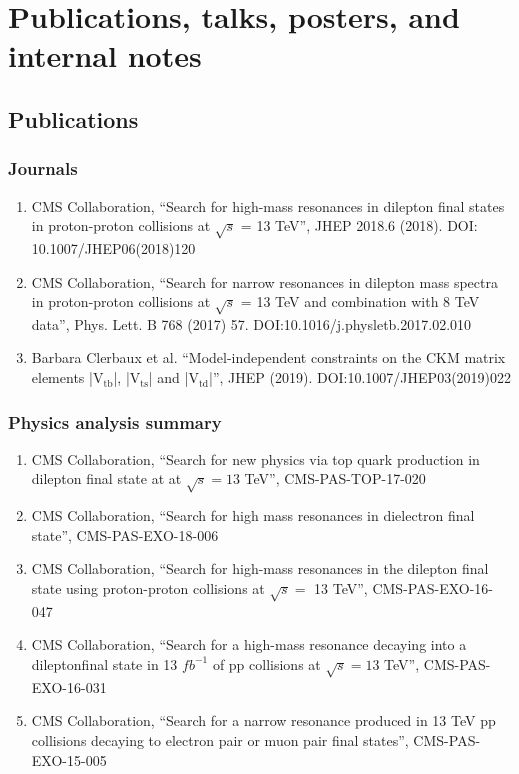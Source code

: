 \chapter*{Publications, talks, posters, and internal notes}\label{chp:Publications}

\section*{Publications}
\subsection*{Journals}
\begin{enumerate}
\item{CMS Collaboration, ``Search for high-mass resonances in dilepton final states in proton-proton collisions at $\sqrt{s}$ = 13 TeV'',  JHEP 2018.6 (2018). DOI: 10.1007/JHEP06(2018)120}
\item{CMS Collaboration, ``Search for narrow resonances in dilepton mass spectra in proton-proton collisions at $\sqrt{s}$ = 13 TeV and combination with 8 TeV data'', Phys. Lett. B 768 (2017) 57. DOI:10.1016/j.physletb.2017.02.010}
\item{Barbara Clerbaux et al. ``Model-independent constraints on the CKM matrix elements |$\mathrm{V_{tb}}$|, |$\mathrm{V_{ts}}$| and |$\mathrm{V_{td}}$|'', JHEP (2019). DOI:10.1007/JHEP03(2019)022}
\end{enumerate}


\subsection*{Physics analysis summary}
\begin{enumerate}%
\item{CMS Collaboration, ``Search for new physics via top quark production in dilepton final state at at $\sqrt{s}=13$ TeV'', CMS-PAS-TOP-17-020}
\item{CMS Collaboration, ``Search for high mass resonances in dielectron final state'', CMS-PAS-EXO-18-006}
\item{CMS Collaboration, ``Search for high-mass resonances in the dilepton final state using proton-proton collisions at $\sqrt{s}=$ 13 TeV'', CMS-PAS-EXO-16-047}
\item{CMS Collaboration, ``Search for a high-mass resonance decaying into a dileptonfinal state in 13 $fb^{-1}$ of pp collisions at $\sqrt{s}=13$ TeV'', CMS-PAS-EXO-16-031}
\item{CMS Collaboration, ``Search for a narrow resonance produced in 13 TeV pp collisions decaying to electron pair or muon pair final states'', CMS-PAS-EXO-15-005}
\end{enumerate}

